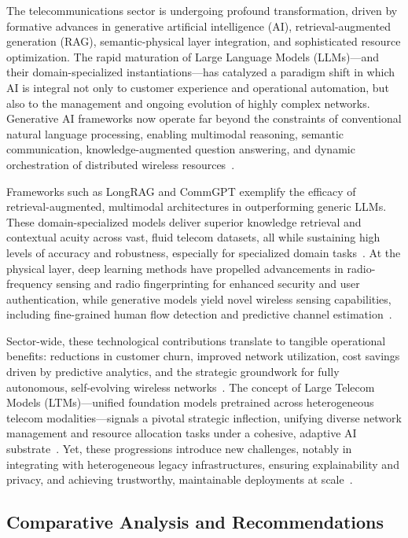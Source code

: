 \documentclass[sigconf]{acmart}
\begin{document}
The telecommunications sector is undergoing profound transformation, driven by formative advances in generative artificial intelligence (AI), retrieval-augmented generation (RAG), semantic-physical layer integration, and sophisticated resource optimization. The rapid maturation of Large Language Models (LLMs)—and their domain-specialized instantiations—has catalyzed a paradigm shift in which AI is integral not only to customer experience and operational automation, but also to the management and ongoing evolution of highly complex networks. Generative AI frameworks now operate far beyond the constraints of conventional natural language processing, enabling multimodal reasoning, semantic communication, knowledge-augmented question answering, and dynamic orchestration of distributed wireless resources~\cite{ref7,ref16}. 

Frameworks such as LongRAG and CommGPT exemplify the efficacy of retrieval-augmented, multimodal architectures in outperforming generic LLMs. These domain-specialized models deliver superior knowledge retrieval and contextual acuity across vast, fluid telecom datasets, all while sustaining high levels of accuracy and robustness, especially for specialized domain tasks~\cite{ref7,ref16}. At the physical layer, deep learning methods have propelled advancements in radio-frequency sensing and radio fingerprinting for enhanced security and user authentication, while generative models yield novel wireless sensing capabilities, including fine-grained human flow detection and predictive channel estimation~\cite{ref18,ref19,ref21}.

Sector-wide, these technological contributions translate to tangible operational benefits: reductions in customer churn, improved network utilization, cost savings driven by predictive analytics, and the strategic groundwork for fully autonomous, self-evolving wireless networks~\cite{ref16,ref46}. The concept of Large Telecom Models (LTMs)—unified foundation models pretrained across heterogeneous telecom modalities—signals a pivotal strategic inflection, unifying diverse network management and resource allocation tasks under a cohesive, adaptive AI substrate~\cite{ref16}. Yet, these progressions introduce new challenges, notably in integrating with heterogeneous legacy infrastructures, ensuring explainability and privacy, and achieving trustworthy, maintainable deployments at scale~\cite{ref7,ref16,ref17,ref18,ref46}.

\subsection{Comparative Analysis and Recommendations}
\end{document}
